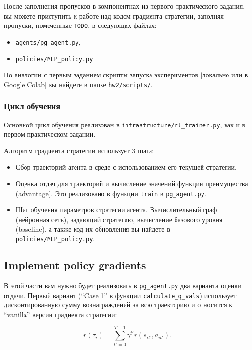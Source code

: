 \documentclass[12pt, oneside]{article}
\begin{document}
После заполнения пропусков в компонентнах из первого практического задания, вы можете приступить к работе над кодом градиента стратегии, заполняя пропуски, помеченные \verb|TODO|, в следующих файлах:

\begin{itemize}
    \item \verb|agents/pg_agent.py|,
    \item \verb|policies/MLP_policy.py|
\end{itemize}

По аналогии с первым заданием скрипты запуска экспериментов [локально или в Google Colab] вы найдете в папке \verb|hw2/scripts/|.

\subsubsection{Цикл обучения}

Основной цикл обучения реализован в \verb|infrastructure/rl_trainer.py|, как и в первом практическом задании.

Алгоритм градиента стратегии использует 3 шага:

\begin{itemize}
    \item Сбор траекторий агента в среде с использованием его текущей стратегии.
    \item Оценка отдач для траекторий и вычисление значений функции преимущества (advantage). Это реализовано в функции \verb|train| в \verb|pg_agent.py|.
    \item Шаг обучения параметров стратегии агента. Вычислительный граф (нейронная сеть), задающий стратегию, вычисление базового уровня (baseline), а также код их обновления вы найдете в \verb|policies/MLP_policy.py|.
\end{itemize}

\subsection{Implement policy gradients}

В этой части вам нужно будет реализовать в \verb|pg_agent.py| два варианта оценки отдачи. Первый вариант (``Case 1'' в функции \verb|calculate_q_vals|) использует дисконтированную сумму вознаграждений за всю траекторию и относится к ``vanilla'' версии градиента стратегии:

\begin{equation}
    r(\tau_i) = \sum_{t' = 0}^{T - 1} {\gamma^{t'} r(s_{it'}, a_{it'})}.
\end{equation}
\end{document}
